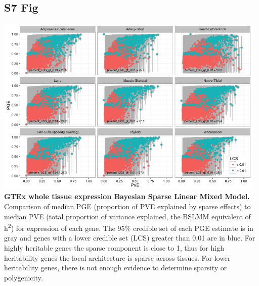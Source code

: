 \documentclass[10pt,letterpaper]{article}
\begin{document}
\begin{singlespace}
\subsection*{S7 Fig}
\includegraphics[width=13cm]{Figures/GenArch_Supp/S4Fig.png}
\label{S7_Fig}
{\bf GTEx whole tissue expression Bayesian Sparse Linear Mixed Model.} Comparison of median PGE (proportion of PVE explained by sparse effects) to median PVE (total proportion of variance explained, the BSLMM equivalent of h\textsuperscript{2}) for expression of each gene. The 95\% credible set of each PGE estimate is in gray and genes with a lower credible set (LCS) greater than 0.01 are in blue. For highly heritable genes the sparse component is close to 1, thus for high heritability genes the local architecture is sparse across tissues. For lower heritability genes, there is not enough evidence to determine sparsity or polygenicity. 


\end{singlespace}
\end{document}
